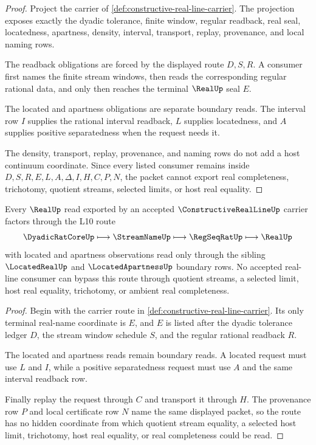 \begin{proof}
Project the carrier of \autoref{def:constructive-real-line-carrier}. The projection exposes exactly the dyadic tolerance, finite window, regular readback, real seal, locatedness, apartness, density, interval, transport, replay, provenance, and local naming rows.

The readback obligations are forced by the displayed route $D,S,R$. A consumer first names the finite stream windows, then reads the corresponding regular rational data, and only then reaches the terminal $\RealUp$ seal $E$.

The located and apartness obligations are separate boundary reads. The interval row $I$ supplies the rational interval readback, $L$ supplies locatedness, and $A$ supplies positive separatedness when the request needs it.

The density, transport, replay, provenance, and naming rows do not add a host continuum coordinate. Since every listed consumer remains inside $D,S,R,E,L,A,\Delta,I,H,C,P,N$, the packet cannot export real completeness, trichotomy, quotient streams, selected limits, or host real equality.
\end{proof}

\begin{theorem}
\label{thm:constructive-real-line-l10-seal-route}
Every $\RealUp$ read exported by an accepted $\ConstructiveRealLineUp$ carrier factors through the L10 route
$$
\DyadicRatCoreUp \longmapsto \StreamNameUp \longmapsto \RegSeqRatUp \longmapsto \RealUp
$$
with located and apartness observations read only through the sibling $\LocatedRealUp$ and $\LocatedApartnessUp$ boundary rows. No accepted real-line consumer can bypass this route through quotient streams, a selected limit, host real equality, trichotomy, or ambient real completeness.
\end{theorem}
\begin{proof}
Begin with the carrier route in \autoref{def:constructive-real-line-carrier}. Its only terminal real-name coordinate is $E$, and $E$ is listed after the dyadic tolerance ledger $D$, the stream window schedule $S$, and the regular rational readback $R$.

The located and apartness reads remain boundary reads. A located request must use $L$ and $I$, while a positive separatedness request must use $A$ and the same interval readback row.

Finally replay the request through $C$ and transport it through $H$. The provenance row $P$ and local certificate row $N$ name the same displayed packet, so the route has no hidden coordinate from which quotient stream equality, a selected host limit, trichotomy, host real equality, or real completeness could be read.
\end{proof}


